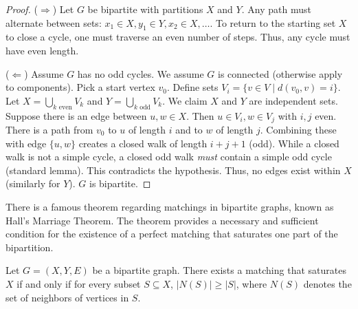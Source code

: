\begin{proof}
(\textbf{$\Rightarrow$}) Let $G$ be bipartite with partitions $X$ and $Y$. Any path must alternate between sets: $x_1 \in X, y_1 \in Y, x_2 \in X, \dots$. To return to the starting set $X$ to close a cycle, one must traverse an even number of steps. Thus, any cycle must have even length.

(\textbf{$\Leftarrow$}) Assume $G$ has no odd cycles. We assume $G$ is connected (otherwise apply to components). Pick a start vertex $v_0$.
Define sets $V_i = \{ v \in V \mid d(v_0, v) = i \}$.
Let $X = \bigcup_{k \text{ even}} V_k$ and $Y = \bigcup_{k \text{ odd}} V_k$.
We claim $X$ and $Y$ are independent sets.
Suppose there is an edge between $u, w \in X$. Then $u \in V_i, w \in V_j$ with $i, j$ even.
There is a path from $v_0$ to $u$ of length $i$ and to $w$ of length $j$. Combining these with edge $\{u, w\}$ creates a closed walk of length $i+j+1$ (odd).
While a closed walk is not a simple cycle, a closed odd walk \textit{must} contain a simple odd cycle (standard lemma). This contradicts the hypothesis.
Thus, no edges exist within $X$ (similarly for $Y$). $G$ is bipartite.
\end{proof}

There is a famous theorem regarding matchings in bipartite graphs, known as Hall's Marriage Theorem. The theorem provides a necessary and sufficient condition for the existence of a perfect matching that saturates one part of the bipartition.

\begin{theorem}
Let $G = (X, Y, E)$ be a bipartite graph. There exists a matching that saturates $X$ if and only if for every subset $S \subseteq X$, $|N(S)| \ge |S|$, where $N(S)$ denotes the set of neighbors of vertices in $S$.
\end{theorem}

